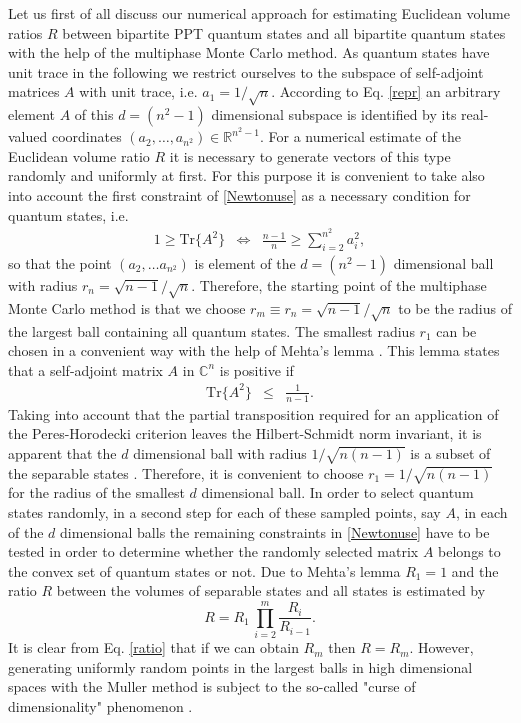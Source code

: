 \documentclass[12pt]{iopart}
\begin{document}
Let us first of all discuss  our numerical approach for estimating Euclidean volume ratios $R$ between bipartite PPT quantum states and all bipartite quantum states with the help of the multiphase Monte Carlo method. As quantum states have unit trace in the following we restrict ourselves to the subspace of 
self-adjoint matrices $A$ with unit trace, i.e. $a_1=1/\sqrt{n}$. According to Eq. \eqref{repr} an arbitrary 
element $A$ of this $d=(n^2-1)$ dimensional subspace is identified by its real-valued coordinates $(a_2,\dots, a_{n^2}) \in \mathbb{R}^{n^2-1}$. For a numerical estimate of the Euclidean volume 
ratio $R$ it is necessary to generate vectors of this type randomly and uniformly at first. For this purpose it is convenient to take also into account the first constraint of \eqref{Newtonuse} 
as a necessary condition for quantum states, i.e.
\begin{eqnarray}
 1 \geqslant \mathrm{Tr}\{A^2\}& \Leftrightarrow& \frac{n-1}{n} \geqslant \sum^{n^2}_{i=2} a^2_i, \label{lball}
\end{eqnarray}
so that the point $(a_2,\dots a_{n^2})$ is element of the $d=(n^2-1)$ dimensional ball with radius $r_n=\sqrt{n-1}/\sqrt{n}$. Therefore, the starting point
of the multiphase Monte Carlo method is that we choose 
$r_m\equiv r_n=\sqrt{n-1}/\sqrt{n}$ to be the radius of the largest ball containing all quantum states. The smallest radius $r_1$ can be chosen in a convenient way with the help of
Mehta's lemma \cite{Mehta89}. This lemma states that a self-adjoint matrix $A$ in $\mathbb{C}^n$ is positive if
\begin{eqnarray}
\mathrm{Tr}\{A^2\}&\leqslant& \frac{1}{n-1}.
\end{eqnarray}
Taking into account that the partial transposition required for an application of the Peres-Horodecki criterion leaves the Hilbert-Schmidt norm invariant, it is apparent that the $d$ 
dimensional ball with radius $1/\sqrt{n(n-1)}$ is a subset of
the separable states \cite{Zyczkowski0, Mehta89}. Therefore, it is convenient to choose 
$r_1=1/\sqrt{n(n-1)}$ for the radius of
the smallest $d$ dimensional ball. In order to select quantum states randomly, 
in a second step for each of these sampled points, say $A$, in each of the $d$ dimensional balls the remaining constraints in \eqref{Newtonuse} have to be tested in order to determine whether the randomly selected 
matrix $A$ belongs to the convex set of quantum states or not.  Due to Mehta's lemma $R_1=1$ and the ratio $R$ between the volumes of separable states and all states is estimated by
\begin{equation}
R = R_1\,\displaystyle\prod_{i=2}^m\frac{R_i}{R_{i-1}}. \label{ratio}
\end{equation}
It is clear from Eq. \eqref{ratio} that if we can obtain $R_m$ then $R=R_m$. However, generating uniformly random points in the largest balls in high dimensional spaces with the Muller method is subject
to the so-called "curse of dimensionality" phenomenon \cite{curseofdimensionality}.
\end{document}
